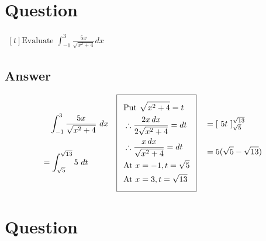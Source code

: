 \documentclass[17pt]{extarticle}
\begin{document}
\noindent
\begin{fleqn} 


\section{Question} 

$\begin{aligned}[t] 
\text{Evaluate \ } \int_{-1}^{3} \frac{5x}{\sqrt{x^2+4}}dx
\end{aligned}$

\subsection*{Answer}
\begin{equation} \nonumber
\begin{alignedat}{4}
& \quad \int_{-1}^{3} \frac{5x}{\sqrt{x^2+4}}\ dx \\
& \\
&= \int_{\sqrt{5}}^{\sqrt{13}}5\ dt \\
\end{alignedat}
\quad 
\begin{alignedat}{4}
    \addtolength{\fboxsep}{5pt}
    \boxed{
     \begin{split}
       & \text{Put } \sqrt{x^2+4}=t\\
       & \therefore \frac{2x\,dx}{2\sqrt{x^2+4}}=dt\\
        & \therefore \frac{x\,dx}{\sqrt{x^2+4}}=dt\\
         & \text{At } x= -1, t= \sqrt{5}\\
         & \text{At } x= 3, t= \sqrt{13}\\
        \end{split}
     }\end{alignedat}
\quad
\begin{alignedat}{4}
&= \left[\ 5t \ \right]_{\sqrt{5}}^{\sqrt{13}} \\
& \\
&= 5 ( \sqrt{5} - \sqrt{13} ) \\
&  \\
\end{alignedat}
\end{equation}

\section{Question} 


\end{fleqn}
\end{document}
